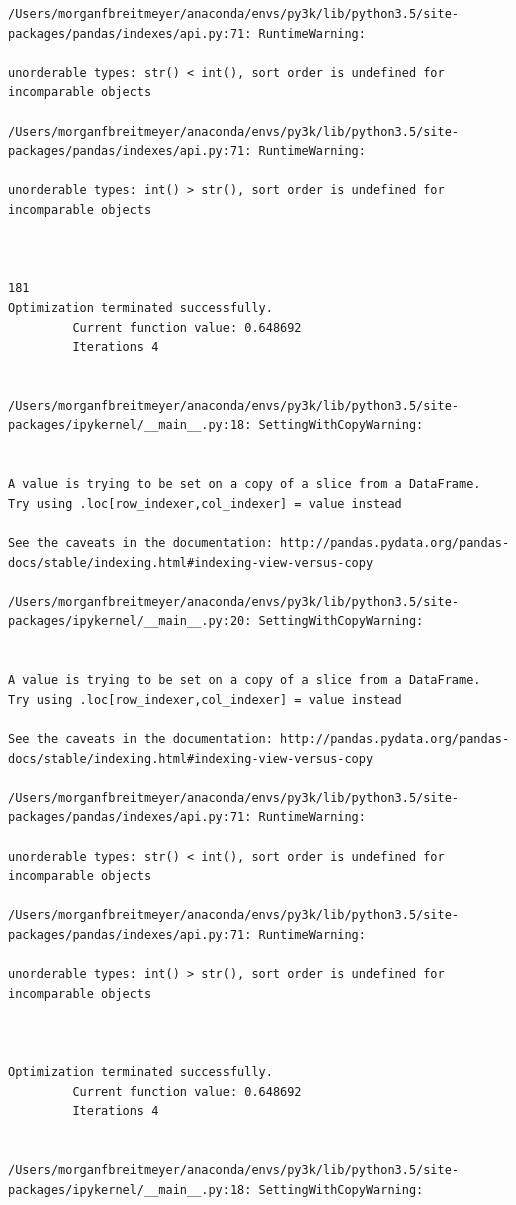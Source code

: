 \begin{lstlisting}
/Users/morganfbreitmeyer/anaconda/envs/py3k/lib/python3.5/site-packages/pandas/indexes/api.py:71: RuntimeWarning:

unorderable types: str() < int(), sort order is undefined for incomparable objects

/Users/morganfbreitmeyer/anaconda/envs/py3k/lib/python3.5/site-packages/pandas/indexes/api.py:71: RuntimeWarning:

unorderable types: int() > str(), sort order is undefined for incomparable objects



181
Optimization terminated successfully.
         Current function value: 0.648692
         Iterations 4


/Users/morganfbreitmeyer/anaconda/envs/py3k/lib/python3.5/site-packages/ipykernel/__main__.py:18: SettingWithCopyWarning:


A value is trying to be set on a copy of a slice from a DataFrame.
Try using .loc[row_indexer,col_indexer] = value instead

See the caveats in the documentation: http://pandas.pydata.org/pandas-docs/stable/indexing.html#indexing-view-versus-copy

/Users/morganfbreitmeyer/anaconda/envs/py3k/lib/python3.5/site-packages/ipykernel/__main__.py:20: SettingWithCopyWarning:


A value is trying to be set on a copy of a slice from a DataFrame.
Try using .loc[row_indexer,col_indexer] = value instead

See the caveats in the documentation: http://pandas.pydata.org/pandas-docs/stable/indexing.html#indexing-view-versus-copy

/Users/morganfbreitmeyer/anaconda/envs/py3k/lib/python3.5/site-packages/pandas/indexes/api.py:71: RuntimeWarning:

unorderable types: str() < int(), sort order is undefined for incomparable objects

/Users/morganfbreitmeyer/anaconda/envs/py3k/lib/python3.5/site-packages/pandas/indexes/api.py:71: RuntimeWarning:

unorderable types: int() > str(), sort order is undefined for incomparable objects



Optimization terminated successfully.
         Current function value: 0.648692
         Iterations 4


/Users/morganfbreitmeyer/anaconda/envs/py3k/lib/python3.5/site-packages/ipykernel/__main__.py:18: SettingWithCopyWarning:



\end{lstlisting}
